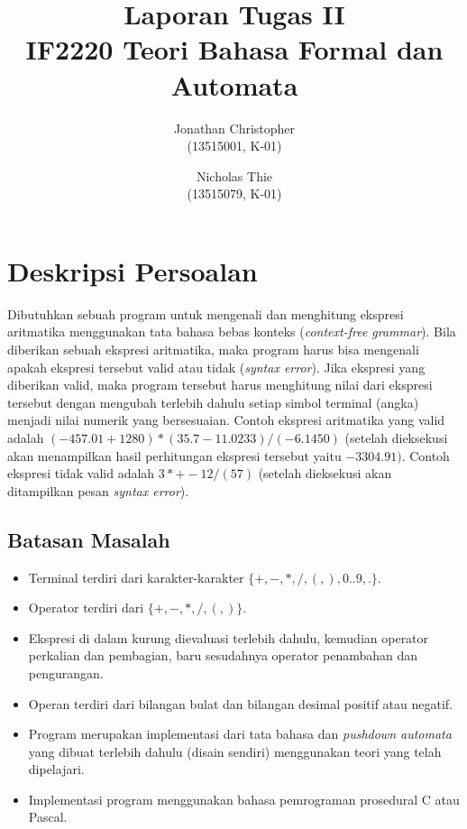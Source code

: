 \documentclass[a4paper,titlepage]{article}
\begin{document}
	\title{Laporan Tugas II \\ IF2220 Teori Bahasa Formal dan Automata}
	\author{
			Jonathan Christopher \\
			(13515001, K-01)
		\and
			Nicholas Thie \\
			(13515079, K-01)
	}
	\maketitle

	\section{Deskripsi Persoalan}

		Dibutuhkan sebuah program untuk mengenali dan menghitung ekspresi aritmatika menggunakan tata bahasa bebas konteks (\textit{context-free grammar}). Bila diberikan sebuah ekspresi aritmatika, maka program harus bisa mengenali apakah ekspresi tersebut valid atau tidak (\textit{syntax error}). Jika ekspresi yang diberikan valid, maka program tersebut harus menghitung nilai dari ekspresi tersebut dengan mengubah terlebih dahulu setiap simbol terminal (angka) menjadi nilai numerik yang bersesuaian. Contoh ekspresi aritmatika yang valid adalah $(-457.01+1280)*(35.7-11.0233)/(-6.1450)$ (setelah dieksekusi akan menampilkan hasil perhitungan ekspresi tersebut yaitu $-3304.91)$. Contoh ekspresi tidak valid adalah $3*+-12/(57)$ (setelah dieksekusi akan ditampilkan pesan \textit{syntax error}).

		\subsection{Batasan Masalah}

		\begin{itemize}
			\item Terminal terdiri dari karakter-karakter $\{+, -, *, /, (, ), 0..9, .\}$.
			\item Operator terdiri dari $\{+, -, *, /, (, )\}$.
			\item Ekspresi di dalam kurung dievaluasi terlebih dahulu, kemudian operator perkalian dan pembagian, baru sesudahnya operator penambahan dan pengurangan.
			\item Operan terdiri dari bilangan bulat dan bilangan desimal positif atau negatif.
			\item Program merupakan implementasi dari tata bahasa dan \textit{pushdown automata} yang dibuat terlebih dahulu (disain sendiri) menggunakan teori yang telah dipelajari.
			\item Implementasi program menggunakan bahasa pemrograman prosedural C atau Pascal.
		\end{itemize}
\end{document}
